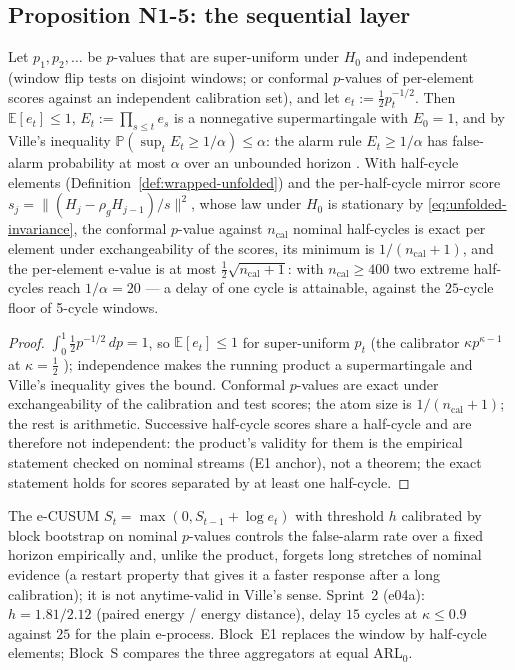 \subsection{Proposition N1-5: the sequential layer}
\label{sec:n1-5}

\begin{proposition}
\label{prop:n1-5}
Let $p_1, p_2, \dots$ be $p$-values that are super-uniform under $H_0$ and
independent (window flip tests on disjoint windows; or conformal $p$-values
of per-element scores against an independent calibration set), and let
$e_t := \tfrac12 p_t^{-1/2}$. Then $\mathbb{E}[e_t] \le 1$, $E_t := \prod_{s
\le t} e_s$ is a nonnegative supermartingale with $E_0 = 1$, and by Ville's
inequality $\mathbb{P}(\sup_t E_t \ge 1/\alpha) \le \alpha$: the alarm rule
$E_t \ge 1/\alpha$ has false-alarm probability at most $\alpha$ over an
unbounded horizon \cite{vovk2021evalues,perezortiz2024estatistics}. With
half-cycle elements (Definition~\ref{def:wrapped-unfolded}) and the
per-half-cycle mirror score $s_j = \|(H_j - \rho_g H_{j-1})/s\|^2$, whose
law under $H_0$ is stationary by \eqref{eq:unfolded-invariance}, the
conformal $p$-value against $n_{\mathrm{cal}}$ nominal half-cycles is exact
per element under exchangeability of the scores, its minimum is
$1/(n_{\mathrm{cal}}+1)$, and the per-element e-value is at most
$\tfrac12\sqrt{n_{\mathrm{cal}}+1}$: with $n_{\mathrm{cal}} \ge 400$ two
extreme half-cycles reach $1/\alpha = 20$ --- a delay of one cycle is
attainable, against the $25$-cycle floor of 5-cycle windows.
\end{proposition}

\begin{proof}
$\int_0^1 \tfrac12 p^{-1/2}\,dp = 1$, so $\mathbb{E}[e_t] \le 1$ for
super-uniform $p_t$ (the calibrator $\kappa p^{\kappa-1}$ at $\kappa =
\tfrac12$ \cite{vovk2021evalues}); independence makes the running product a
supermartingale and Ville's inequality gives the bound. Conformal
$p$-values are exact under exchangeability of the calibration and test
scores; the atom size is $1/(n_{\mathrm{cal}}+1)$; the rest is arithmetic.
Successive half-cycle scores share a half-cycle and are therefore not
independent: the product's validity for them is the empirical statement
checked on nominal streams (E1 anchor), not a theorem; the exact statement
holds for scores separated by at least one half-cycle.
\end{proof}

\begin{remark}
\label{rem:ecusum}
The e-CUSUM $S_t = \max(0, S_{t-1} + \log e_t)$ with threshold $h$
calibrated by block bootstrap on nominal $p$-values controls the false-alarm
rate over a fixed horizon empirically and, unlike the product, forgets
long stretches of nominal evidence (a restart property that gives it a
faster response after a long calibration); it is not anytime-valid in
Ville's sense. Sprint~2 (e04a): $h = 1.81/2.12$ (paired energy / energy
distance), delay $15$ cycles at $\kappa \le 0.9$ against $25$ for the plain
e-process. Block~E1 replaces the window by half-cycle elements; Block~S
compares the three aggregators at equal ARL$_0$.
\end{remark}

